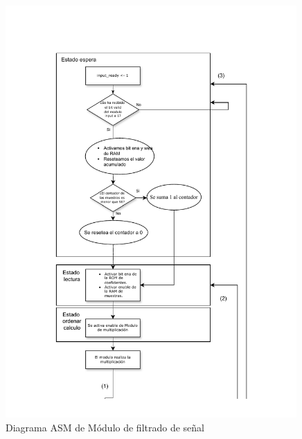 \begin{figure}[h!]
    \centering
    \includegraphics[width=0.99\textwidth]{./Images/img_implementacion_hw/Diagramaasmfiltrado1.pdf}
    \caption{Diagrama ASM de Módulo de filtrado de señal}
    \label{fig:Diagramaasmfiltrado1}
\end{figure} 

